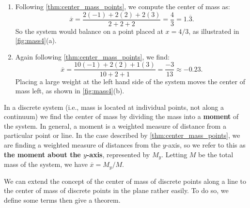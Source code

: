 {\begin{enumerate}
	\item Following \autoref{thm:center_mass_points}, we compute the center of mass as:
	$$\overline{x}=\frac{2(-1) + 2(2)+2(3)}{2+2+2} = \frac43 = 1.\overline{3}.$$
	So the system would balance on a point placed at $x=4/3$, as illustrated in \autoref{fig:mass4}(a).
	
	\item	Again following \autoref{thm:center_mass_points}, we find:
	$$\overline{x} = \frac{10(-1)+2(2)+1(3)}{10+2+1} = \frac{-3}{13} \approx -0.23.$$
	Placing a large weight at the left hand side of the system moves the center of mass left, as shown in \autoref{fig:mass4}(b).\eoehere
\end{enumerate}}

In a discrete system (i.e., mass is located at individual points, not along a continuum) we find the center of mass by dividing the mass into a \textbf{moment} of the system. In general, a moment is a weighted measure of distance from a particular point or line. In the case described by \autoref{thm:center_mass_points}, we are finding a weighted measure of distances from the $y$-axis, so we refer to this as \textbf{the moment about the $y$-axis}, represented by $M_y$.  Letting $M$ be the total mass of the system, we have  $\overline{x} = M_y/M$. 

We can extend the concept of the center of mass of discrete points along a line to the center of mass of discrete points in the plane rather easily. To do so, we define some terms then give a theorem.

